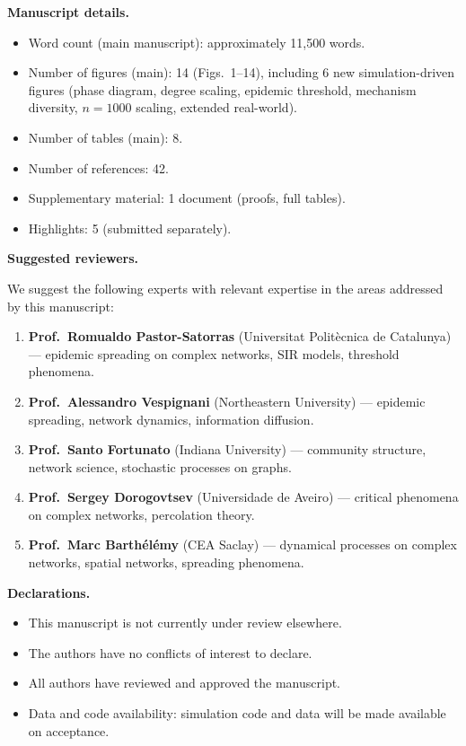 \documentclass[12pt,a4paper]{article}
\begin{document}
\medskip

\noindent\textbf{Manuscript details.}

\begin{itemize}
  \item Word count (main manuscript): approximately 11,500 words.
  \item Number of figures (main): 14 (Figs.\ 1--14), including 6 new
    simulation-driven figures (phase diagram, degree scaling, epidemic
    threshold, mechanism diversity, $n=1000$ scaling, extended real-world).
  \item Number of tables (main): 8.
  \item Number of references: 42.
  \item Supplementary material: 1 document (proofs, full tables).
  \item Highlights: 5 (submitted separately).
\end{itemize}

\medskip

\noindent\textbf{Suggested reviewers.}

We suggest the following experts with relevant expertise in the areas
addressed by this manuscript:

\begin{enumerate}
  \item \textbf{Prof.\ Romualdo Pastor-Satorras} (Universitat Polit\`ecnica
    de Catalunya) --- epidemic spreading on complex networks, SIR models,
    threshold phenomena.
  \item \textbf{Prof.\ Alessandro Vespignani} (Northeastern University) ---
    epidemic spreading, network dynamics, information diffusion.
  \item \textbf{Prof.\ Santo Fortunato} (Indiana University) --- community
    structure, network science, stochastic processes on graphs.
  \item \textbf{Prof.\ Sergey Dorogovtsev} (Universidade de Aveiro) ---
    critical phenomena on complex networks, percolation theory.
  \item \textbf{Prof.\ Marc Barth\'el\'emy} (CEA Saclay) --- dynamical
    processes on complex networks, spatial networks, spreading phenomena.
\end{enumerate}

\medskip

\noindent\textbf{Declarations.}

\begin{itemize}
  \item This manuscript is not currently under review elsewhere.
  \item The authors have no conflicts of interest to declare.
  \item All authors have reviewed and approved the manuscript.
  \item Data and code availability: simulation code and data will be made
    available on acceptance.
\end{itemize}
\end{document}
